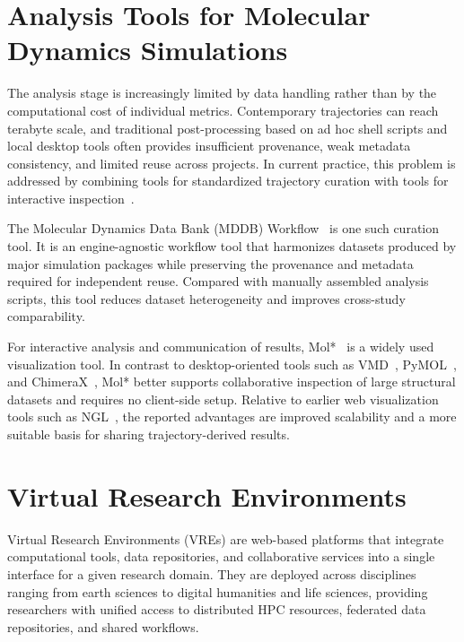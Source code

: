 \documentclass[
  digital,     %
  color,       %
  oneside,     %
  nosansbold,  %
  nocolorbold, %
  lof,         %
  lot,         %
]{fithesis4}
\begin{document}
\section{Analysis Tools for Molecular Dynamics Simulations}
\label{sec:md_analysis_tools}

The analysis stage is increasingly limited by data handling rather than by the computational cost of individual metrics. Contemporary trajectories can reach terabyte scale, and traditional post-processing based on ad hoc shell scripts and local desktop tools often provides insufficient provenance, weak metadata consistency, and limited reuse across projects. In current practice, this problem is addressed by combining tools for standardized trajectory curation with tools for interactive inspection~\cite{md_analysis_tools}.

The Molecular Dynamics Data Bank (MDDB) Workflow~\cite{mddb_workflow} is one such curation tool. It is an engine-agnostic workflow tool that harmonizes datasets produced by major simulation packages while preserving the provenance and metadata required for independent reuse. Compared with manually assembled analysis scripts, this tool reduces dataset heterogeneity and improves cross-study comparability.

For interactive analysis and communication of results, Mol*~\cite{molstar_viewer} is a widely used visualization tool. In contrast to desktop-oriented tools such as VMD~\cite{VMD}, PyMOL~\cite{PyMOL}, and ChimeraX~\cite{ChimeraX}, Mol* better supports collaborative inspection of large structural datasets and requires no client-side setup. Relative to earlier web visualization tools such as NGL~\cite{ngl_viewer}, the reported advantages are improved scalability and a more suitable basis for sharing trajectory-derived results.

\section{Virtual Research Environments}
\label{sec:VREs}

Virtual Research Environments (VREs) are web-based platforms that integrate computational tools, data repositories, and collaborative services into a single interface for a given research domain. They are deployed across disciplines ranging from earth sciences to digital humanities and life sciences, providing researchers with unified access to distributed HPC resources, federated data repositories, and shared workflows.
\end{document}
